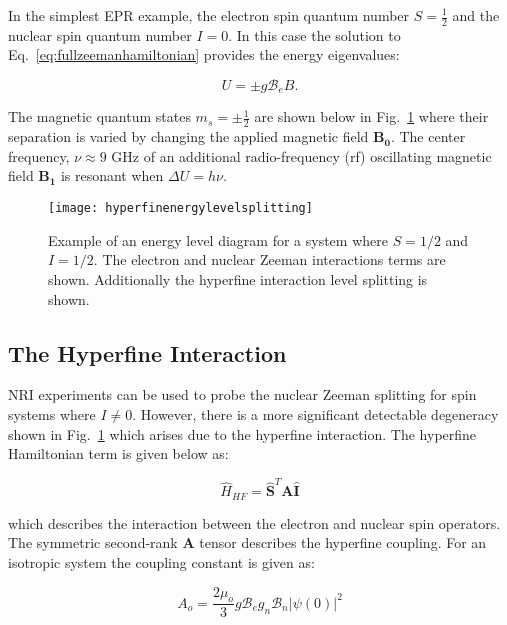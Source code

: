 In the simplest EPR example, the electron spin quantum number $S=\frac{1}{2}$ and the nuclear spin quantum number $I=0$. In this case the solution to Eq.~\ref{eq:fullzeemanhamiltonian} provides the energy eigenvalues: 

\begin{equation}
\label{eq:fullzeemanhamiltonian}
U = \pm g \mathcal{B}_{e}B.
\end{equation} 

The magnetic quantum states $m_{s} = \pm \frac{1}{2}$ are shown below in Fig.~\ref{fig:hyperfinenergylevelsplitting} where their separation is varied by changing the applied magnetic field $\bm{B_{0}}$. The center frequency, $\nu \approx 9$ GHz of an additional radio-frequency (rf) oscillating magnetic field $\bm{B_{1}}$ is resonant when $\Delta U=h\nu$. 

\begin{figure}[h]
\centering
\texttt{[image: hyperfinenergylevelsplitting]}
\caption{\label{fig:hyperfinenergylevelsplitting} Example of an energy level diagram for a system where $S=1/2$ and $I=1/2$. The electron and nuclear Zeeman interactions terms are shown. Additionally the hyperfine interaction level splitting is shown.}
\end{figure}




\subsection{\label{sec:hyperfine}The Hyperfine Interaction}
NRI experiments can be used to probe the nuclear Zeeman splitting for spin systems where $I \neq 0$. However, there is a more significant detectable degeneracy shown in Fig.~\ref{fig:hyperfinenergylevelsplitting} which arises due to the hyperfine interaction. The hyperfine Hamiltonian term is given below as: 

\begin{equation}
\label{eq:fullzeemanhamiltonian}
\hat{H}_{HF}=\hat{\bm{S}}^{T} \bm{A} \hat{\bm{I}}
\end{equation} 

\noindent which describes the interaction between the electron and nuclear spin operators. The symmetric second-rank $\bm{A}$ tensor describes the hyperfine coupling. For an isotropic system the coupling constant is given as:

\begin{equation}
\label{eq:hyperfinestrength}
A_{o} = \frac{2\mu_{o}}{3} g\mathcal{B}_{e} g_{n}\mathcal {B}_{n}|\psi (0)|^{2} 
\end{equation} 

